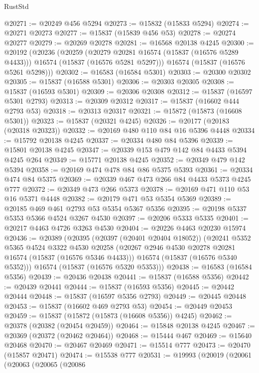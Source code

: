 \begin{lexlean}{RustStd}
\begin{coremodule}
@20271 := @20249 @456 @5294
@20273 := @15832 (@15833 @5294)
@20274 := @20271 @20273
@20277 := @15837 (@15839 @456 @53)
@20278 := @20274 @20277
@20279 := @20269 @20278
@20281 := @16568 @20138 @4245
@20300 := @20192
    (@20236
      (@20259
        (@20279 @20281 @16574 (@15837 (@16576 @5289 @4433)))
        @16574
        (@15837 (@16576 @5281 @5297)))
      @16574
      (@15837 (@16576 @5261 @5298)))
@20302 := @16583 (@16584 @5301)
@20303 := @20300 @20302
@20305 := @15837 (@16588 @5301)
@20306 := @20303 @20305
@20308 := @15837 (@16593 @5301)
@20309 := @20306 @20308
@20312 := @15837 (@16597 @5301 @2793)
@20313 := @20309 @20312
@20317 := @15837 (@16602 @444 @2793 @53)
@20318 := @20313 @20317
@20321 := @15872 (@15873 (@16608 @5301))
@20323 := @15837 (@20321 @4245)
@20326 := @20177 (@20183 (@20318 @20323))
@20332 := @20169 @480 @110 @84 @16 @5396 @4448
@20334 := @15792 @20138 @4245
@20337 := @20334 @480 @84 @5396
@20339 := @15801 @20138 @4245
@20347 := @20339 @153 @479 @142 @84 @4433 @5394 @4245 @264
@20349 := @15771 @20138 @4245
@20352 := @20349 @479 @142 @5394
@20358 := @20169 @474 @478 @84 @86 @5375 @5393
@20361 := @20334 @474 @84 @5375
@20369 := @20339 @467 @473 @266 @84 @4433 @5373 @4245 @777
@20372 := @20349 @473 @266 @5373
@20378 := @20169 @471 @110 @53 @16 @5371 @4448
@20382 := @20179 @471 @53 @5354 @5369
@20389 := @20185 @469 @461 @2793 @53 @5354 @5367 @5356
@20395 := @20198 @5337 @5353 @5366 @4524 @3267 @4530
@20397 := @20206 @5333 @5335
@20401 := @20217 @4463 @4726 @3263 @4530
@20404 := @20226 @4463 @20230 @15974
@20436 := @20389
    (@20395
      (@20397 (@20401 @20404 @18052))
      (@20241
        @5352
        @5365
        @4524
        @3322
        @4530
        @20258
        (@20267 @2946 @4530 @20278 @20281 @16574 (@15837 (@16576 @5346 @4433)))
        @16574
        (@15837 (@16576 @5340 @5352)))
      @16574
      (@15837 (@16576 @5320 @5353)))
@20438 := @16583 (@16584 @5356)
@20439 := @20436 @20438
@20441 := @15837 (@16588 @5356)
@20442 := @20439 @20441
@20444 := @15837 (@16593 @5356)
@20445 := @20442 @20444
@20448 := @15837 (@16597 @5356 @2793)
@20449 := @20445 @20448
@20453 := @15837 (@16602 @469 @2793 @53)
@20454 := @20449 @20453
@20459 := @15837 (@15872 (@15873 (@16608 @5356)) @4245)
@20462 := @20378 (@20382 (@20454 @20459))
@20464 := @15848 @20138 @4245
@20467 := @20369 (@20372 (@20462 @20464))
@20468 := @15444 @467
@20469 := @15640 @20468
@20470 := @20467 @20469
@20471 := @15514 @777
@20473 := @20470 (@15857 @20471)
@20474 := @15538 @777
@20531 := @19993
    (@20019
      (@20061
        (@20063
          (@20065
            (@20086

\end{coremodule}
\end{lexlean}
